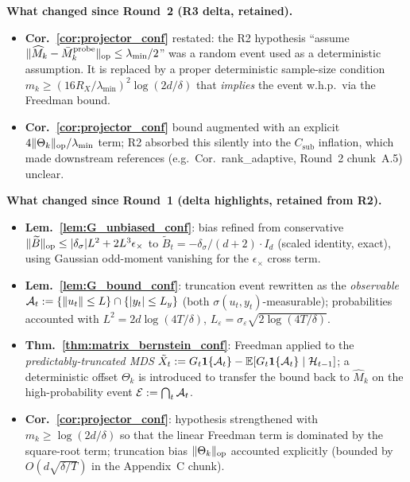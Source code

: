 \textbf{What changed since Round~2 (R3 delta, retained).}
\begin{itemize}[leftmargin=*,itemsep=1pt,topsep=1pt]
\item \textbf{Cor.~\ref{cor:projector_conf}} restated: the R2 hypothesis
``assume $\|\widehat M_k-\bar M_k^{\mathrm{probe}}\|_{\mathrm{op}}\le\lambda_{\min}/2$''
was a random event used as a deterministic assumption. It is replaced
by a proper deterministic sample-size condition
$m_k\ge(16R_X/\lambda_{\min})^2\log(2d/\delta)$ that \emph{implies}
the event w.h.p.\ via the Freedman bound.
\item \textbf{Cor.~\ref{cor:projector_conf}} bound augmented with an
explicit $4\|\Theta_k\|_{\mathrm{op}}/\lambda_{\min}$ term; R2 absorbed this
silently into the $C_{\mathrm{sub}}$ inflation, which made downstream
references (e.g.\ Cor.~rank\_adaptive, Round~2 chunk~A.5) unclear.
\end{itemize}

\textbf{What changed since Round~1 (delta highlights, retained from R2).}
\begin{itemize}[leftmargin=*,itemsep=1pt,topsep=1pt]
\item \textbf{Lem.~\ref{lem:G_unbiased_conf}}: bias refined from conservative
$\|\widetilde B\|_{\mathrm{op}}\le|\delta_\sigma|L^2+2L^3\epsilon_\times$ to
$\widetilde B_t=-\delta_\sigma/(d+2)\cdot I_d$ (scaled identity, exact),
using Gaussian odd-moment vanishing for the $\epsilon_\times$ cross term.
\item \textbf{Lem.~\ref{lem:G_bound_conf}}: truncation event rewritten as
the \emph{observable} $\mathcal{A}_t:=\{\|u_t\|\le L\}\cap\{|y_t|\le L_y\}$
(both $\sigma(u_t,y_t)$-measurable); probabilities accounted with
$L^2=2d\log(4T/\delta)$, $L_\varepsilon=\sigma_\varepsilon\sqrt{2\log(4T/\delta)}$.
\item \textbf{Thm.~\ref{thm:matrix_bernstein_conf}}: Freedman applied to the
\emph{predictably-truncated MDS} $\tilde X_t:=G_t\mathbf 1\{\mathcal{A}_t\}-\mathbb{E}[G_t\mathbf 1\{\mathcal{A}_t\}\mid\mathcal{H}_{t-1}]$;
a deterministic offset $\Theta_k$ is introduced to transfer the bound
back to $\widehat M_k$ on the high-probability event $\mathcal{E}:=\bigcap_t\mathcal{A}_t$.
\item \textbf{Cor.~\ref{cor:projector_conf}}: hypothesis strengthened
with $m_k\ge\log(2d/\delta)$ so that the linear Freedman term is dominated
by the square-root term; truncation bias $\|\Theta_k\|_{\mathrm{op}}$ accounted
explicitly (bounded by $O(d\sqrt{\delta/T})$ in the Appendix~C chunk).
\end{itemize}

